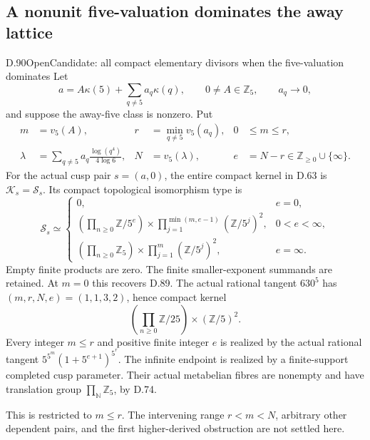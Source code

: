 \subsection{A nonunit five-valuation dominates the away lattice}

\begin{statement}{D.90}{Open}{Candidate: all compact elementary divisors when the five-valuation dominates}
Let
\[
 a=A\kappa(5)+\sum_{q\ne5}a_q\kappa(q),\qquad
 0\ne A\in\mathbb Z_5,\qquad a_q\longrightarrow0,
\]
and suppose the away-five class is nonzero. Put
\[
 \begin{aligned}
 m&=v_5(A),&r&=\min_{q\ne5}v_5(a_q),&0&\le m\le r,\\
 \lambda&=\sum_{q\ne5}a_q\frac{\log(q^4)}{4\log6},&
 N&=v_5(\lambda),&e&=N-r\in\mathbb Z_{\ge0}\cup\{\infty\}.
 \end{aligned}                                               \tag{D.90.1}
\]
For the actual cusp pair \(s=(a,0)\), the entire compact
kernel in D.63 is \(\mathcal K_s=\mathcal S_s\). Its compact
topological isomorphism type is
\[
 \mathcal S_s\simeq
 \begin{cases}
 0,&e=0,\\
 \displaystyle
 \left(\prod_{n\ge0}\mathbb Z/5^e\right)
 \times\prod_{j=1}^{\min(m,e-1)}(\mathbb Z/5^j)^2,
       &0<e<\infty,\\
 \displaystyle
 \left(\prod_{n\ge0}\mathbb Z_5\right)
 \times\prod_{j=1}^{m}(\mathbb Z/5^j)^2,
       &e=\infty.
 \end{cases}                                               \tag{D.90.2}
\]
Empty finite products are zero. The finite smaller-exponent
summands are retained. At \(m=0\) this recovers D.89.
The actual rational tangent \(630^5\) has
\((m,r,N,e)=(1,1,3,2)\), hence compact kernel
\[
             \left(\prod_{n\ge0}\mathbb Z/25\right)
                         \times(\mathbb Z/5)^2.        \tag{D.90.3}
\]
Every integer \(m\le r\) and positive finite integer \(e\)
is realized by the actual rational tangent
\(5^{5^m}(1+5^{e+1})^{5^r}\). The infinite endpoint is
realized by a finite-support completed cusp parameter.
Their actual metabelian fibres are nonempty and have
translation group \(\prod_{\mathbb N}\mathbb Z_5\), by D.74.

This is restricted to \(m\le r\). The intervening range
\(r<m<N\), arbitrary other dependent pairs, and the first
higher-derived obstruction are not settled here.
\end{statement}

